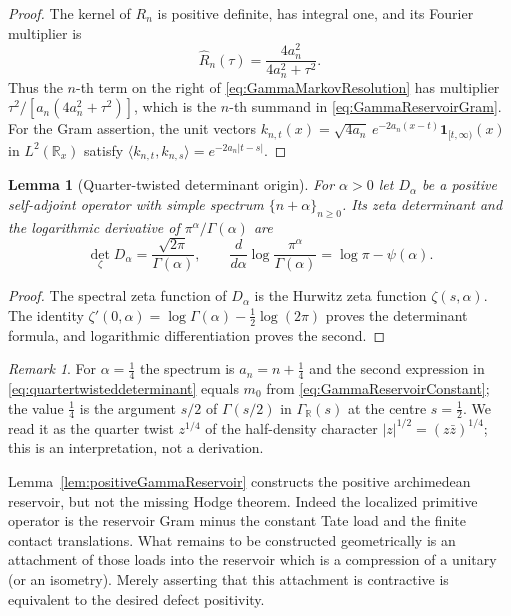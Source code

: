 \documentclass[11pt]{amsart}
\newtheorem{lemma}[theorem]{Lemma}
\theoremstyle{definition}
\theoremstyle{remark}
\newtheorem{remark}[theorem]{Remark}
\begin{document}
\begin{proof}
The kernel of $R_n$ is positive definite, has integral one, and its Fourier
multiplier is
\[
 \widehat R_n(\tau)=\frac{4a_n^2}{4a_n^2+\tau^2}.
\]
Thus the $n$-th term on the right of
\eqref{eq:GammaMarkovResolution} has multiplier
\(\tau^2/[a_n(4a_n^2+\tau^2)]\), which is the $n$-th summand in
\eqref{eq:GammaReservoirGram}.  For the Gram assertion, the unit vectors
\(k_{n,t}(x)=\sqrt{4a_n}\,e^{-2a_n(x-t)}\mathbf1_{[t,\infty)}(x)\) in
\(L^2(\mathbb R_x)\) satisfy
\(\langle k_{n,t},k_{n,s}\rangle=e^{-2a_n|t-s|}\).
\end{proof}

\begin{lemma}[Quarter-twisted determinant origin]
\label{lem:quartertwisteddeterminant}
For $\alpha>0$ let $D_\alpha$ be a positive self-adjoint operator with
simple spectrum $\{n+\alpha\}_{n\ge0}$.  Its zeta determinant and the
logarithmic derivative of $\pi^\alpha/\Gamma(\alpha)$ are
\begin{equation}\label{eq:quartertwisteddeterminant}
 \det_\zeta D_\alpha=\frac{\sqrt{2\pi}}{\Gamma(\alpha)},
 \qquad
 \frac d{d\alpha}\log\frac{\pi^\alpha}{\Gamma(\alpha)}
 =\log\pi-\psi(\alpha).
\end{equation}
\end{lemma}

\begin{proof}
The spectral zeta function of $D_\alpha$ is the Hurwitz zeta function
\(\zeta(s,\alpha)\).  The identity
\(\zeta'(0,\alpha)=\log\Gamma(\alpha)-\frac12\log(2\pi)\) proves the
determinant formula, and logarithmic differentiation proves the second.
\end{proof}

\begin{remark}
For $\alpha=\tfrac14$ the spectrum is $a_n=n+\tfrac14$ and the second
expression in \eqref{eq:quartertwisteddeterminant} equals $m_0$ from
\eqref{eq:GammaReservoirConstant}; the value $\tfrac14$ is the argument
$s/2$ of $\Gamma(s/2)$ in $\Gamma_{\mathbb R}(s)$ at the centre
$s=\tfrac12$.  We read it as the quarter twist $z^{1/4}$ of the
half-density character $|z|^{1/2}=(z\bar z)^{1/4}$; this is an
interpretation, not a derivation.
\end{remark}

Lemma~\ref{lem:positiveGammaReservoir} constructs the positive
archimedean reservoir, but not the missing Hodge theorem.  Indeed the
localized primitive operator is the reservoir Gram minus the constant Tate
load and the finite contact translations.  What remains to be constructed
geometrically is an attachment of those loads into the reservoir which is a
compression of a unitary (or an isometry).  Merely asserting that this
attachment is contractive is equivalent to the desired defect positivity.
\end{document}
